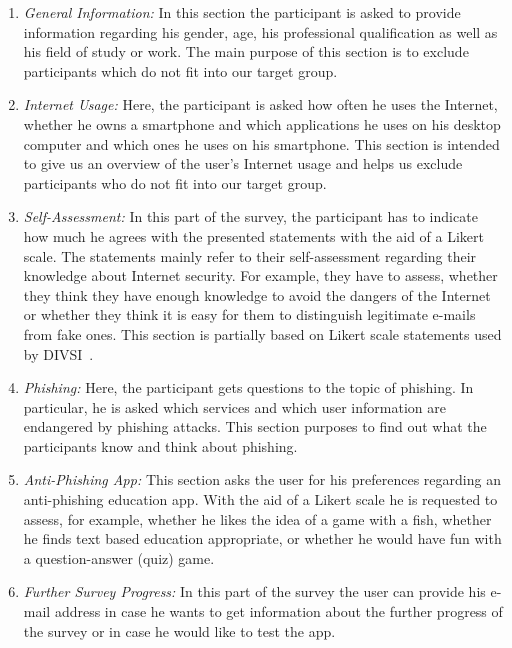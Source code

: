 \begin{enumerate}
	\item \textit{General Information:} In this section the participant is asked to provide information regarding his gender, age, his professional qualification as well as his field of study or work.
 The main purpose of this section is to exclude participants which do not fit into our target group.

	\item \textit{Internet Usage:} Here, the participant is asked how often he uses the Internet, whether he owns a smartphone and which applications he uses on his desktop computer and which ones he uses on his smartphone.
 This section is intended to give us an overview of the user's Internet usage and helps us exclude participants who do not fit into our target group.

	\item \textit{Self-Assessment:} In this part of the survey, the participant has to indicate how much he agrees with the presented statements with the aid of a Likert scale.
 The statements mainly refer to their self-assessment regarding their knowledge about Internet security.
 For example, they have to assess, whether they think they have enough knowledge to avoid the dangers of the Internet or whether they think it is easy for them to distinguish legitimate e-mails from fake ones.
 This section is partially based on Likert scale statements used by DIVSI~\cite{divsi2012divsi}.
	\item \textit{Phishing:} Here, the participant gets questions to the topic of phishing.
 In particular, he is asked which services and which user information are endangered by phishing attacks.
 This section purposes to find out what the participants know and think about phishing.

	\item \textit{Anti-Phishing App:} This section asks the user for his preferences regarding an anti-phishing education app.
 With the aid of a Likert scale he is requested to assess, for example, whether he likes the idea of a game with a fish, whether he finds text based education appropriate, or whether he would have fun with a question-answer (quiz) game.

	\item \textit{Further Survey Progress:} In this part of the survey the user can provide his e-mail address in case he wants to get information about the further progress of the survey or in case he would like to test the app.

\end{enumerate}

